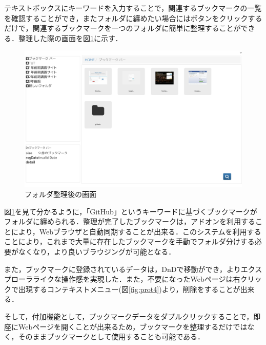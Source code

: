 \documentclass[a4paper,10pt,fleqn]{jsarticle}
\begin{document}
テキストボックスにキーワードを入力することで，関連するブックマークの一覧を確認することができ，またフォルダに纏めたい場合にはボタンをクリックするだけで，関連するブックマークを一つのフォルダに簡単に整理することができる．整理した際の画面を図\ref{fig:prot3}に示す．

\begin{figure}[h]
  \begin{center}
    \includegraphics[width=14.0cm]{./prot3.png}
    \caption{フォルダ整理後の画面} 
    \label{fig:prot3}
  \end{center}
\end{figure}

\newpage

図\ref{fig:prot3}を見て分かるように，「GitHub」というキーワードに基づくブックマークがフォルダに纏められる．整理が完了したブックマークは，アドオンを利用することにより，Webブラウザと自動同期することが出来る．このシステムを利用することにより，これまで大量に存在したブックマークを手動でフォルダ分けする必要がなくなり，より良いブラウジングが可能となる．

また，ブックマークに登録されているデータは，DnDで移動ができ，よりエクスプローラライクな操作感を実現した．また，不要になったWebページは右クリックで出現するコンテキストメニュー(図\ref{fig:prot4})より，削除をすることが出来る．

そして，付加機能として，ブックマークデータをダブルクリックすることで，即座にWebページを開くことが出来るため，ブックマークを整理するだけではなく，そのままブックマークとして使用することも可能である．
\end{document}
